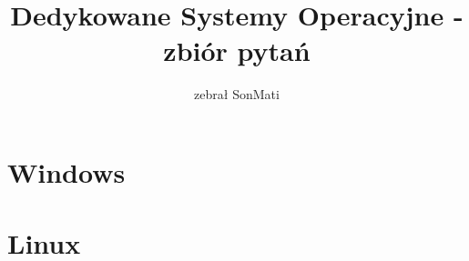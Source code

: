 \documentclass[a4paper,twoside]{article}
\newcommand{\Tak}[1] {
	\color{Gurin}{#1}
}
\newcommand{\Nie}[1] {
	\color{Red}{#1}
}
\newcommand{\question}[9] {
	\textbf{#1}
	\begin{enumerate}[a.]
		\ifnum\pdfstrcmp{#2}{Tak}=0
			\Tak{\item #3}
		\else
			\Nie{\item #3}
		\fi
		\color{black}
		\ifnum\pdfstrcmp{#4}{Tak}=0
			\Tak{\item #5}
		\else
			\Nie{\item #5}
		\fi
		\color{black}
		\ifnum\pdfstrcmp{#6}{Tak}=0
			\Tak{\item #7}
		\else
			\Nie{\item #7}
		\fi
		\color{black}
		\ifnum\pdfstrcmp{#8}{Tak}=0
			\Tak{\item #9}
		\else
			\Nie{\item #9}
		\fi
	\end{enumerate}
}
\begin{document}





\begin{titlepage}
\title{\huge Dedykowane Systemy Operacyjne - zbiór pytań}
\author{\large zebrał SonMati}
\maketitle
\end{titlepage}

\part{Windows}
	
	
	
	
		
	
	
	
	
	
	
	
	
\part{Linux}
	
	
	
	
	
	
	
	
	
	
	
	
\end{document}
